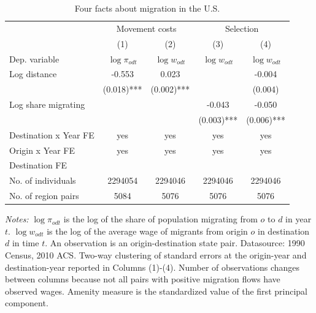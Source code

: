 \begin{table}[hbpt] \begin{center}\begin{threeparttable}\caption{ {Four facts about migration in the U.S.    }} \begin{tabular}{l*{4}c} \toprule
&\multicolumn{2}{c}{Movement costs}&\multicolumn{2}{c}{Selection}\\
&(1)&(2)&(3)&(4)\\
Dep. variable&$\log \pi_{odt}$&$\log w_{odt}$ &$\log w_{odt}$ &$\log w_{odt}$ \\
\midrule
Log distance&-0.553&0.023&&-0.004\\
&(0.018)***&(0.002)***&&(0.004)\\
Log share migrating&&&-0.043&-0.050\\
&&&(0.003)***&(0.006)***\\
\midrule
Destination x Year FE&yes&yes&yes&yes\\
Origin x Year FE&yes&yes&yes&yes\\
Destination FE&&&&\\
No. of individuals&2294054&2294046&2294046&2294046\\
No. of region pairs&5084&5076&5076&5076\\
\bottomrule \end{tabular} \label{Four facts about migration in the U.S.    } \begin{tablenotes} \item {\footnotesize \emph{Notes: } $\log \pi_{odt}$ is the log of the share of population migrating from $ o $ to $ d $ in year $ t $. $\log w_{odt}$ is the log of the average wage of migrants from origin $ o $ in destination $ d $ in time $ t $. An observation is an origin-destination state pair. Datasource: 1990 Census, 2010 ACS. Two-way clustering of standard errors at the origin-year and destination-year reported in Columns (1)-(4). Number of observations changes between columns because not all pairs with positive migration flows have observed wages. Amenity measure is the standardized value of the first principal component. } \end{tablenotes} \end{threeparttable} \end{center} \end{table}
